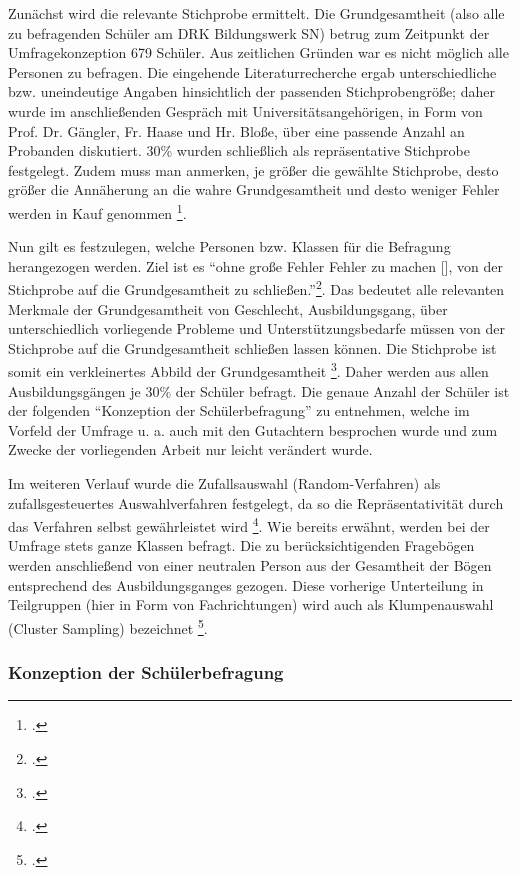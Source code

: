 \noindent
Zunächst wird die relevante Stichprobe ermittelt. Die Grundgesamtheit (also alle zu befragenden Schüler am DRK Bildungswerk SN) betrug zum Zeitpunkt der Umfragekonzeption 679 Schüler. Aus zeitlichen Gründen war es nicht möglich alle Personen zu befragen. Die eingehende Literaturrecherche ergab unterschiedliche bzw. uneindeutige Angaben hinsichtlich der passenden Stichprobengröße; daher wurde im anschließenden Gespräch mit Universitätsangehörigen, in Form von Prof. Dr. Gängler, Fr. Haase und Hr. Bloße, über eine passende Anzahl an Probanden diskutiert. 30\% wurden schließlich als repräsentative Stichprobe festgelegt. Zudem muss man anmerken, je größer die gewählte Stichprobe, desto größer die Annäherung an die wahre Grundgesamtheit und desto weniger Fehler werden in Kauf genommen \footcite[vgl.][65f]{Mayer2013}. 

Nun gilt es festzulegen, welche Personen bzw. Klassen für die Befragung herangezogen werden. Ziel ist es "`ohne große Fehler Fehler zu machen [\punkte], von der Stichprobe auf die Grundgesamtheit zu schließen."'\footcite[60]{Mayer2013}. Das bedeutet alle relevanten Merkmale der Grundgesamtheit von Geschlecht, Ausbildungsgang, über unterschiedlich vorliegende Probleme und Unterstützungsbedarfe müssen von der Stichprobe auf die Grundgesamtheit schließen lassen können. Die Stichprobe ist somit ein verkleinertes Abbild der Grundgesamtheit \footcite [vgl.][197]{Kromrey1995}. Daher werden aus allen Ausbildungsgängen je 30\% der Schüler befragt. Die genaue Anzahl der Schüler ist der folgenden "`Konzeption der Schülerbefragung"' zu entnehmen, welche im Vorfeld der Umfrage u. a. auch mit den Gutachtern besprochen wurde und zum Zwecke der vorliegenden Arbeit nur leicht verändert wurde.

Im weiteren Verlauf wurde die Zufallsauswahl (Random-Verfahren) als zufallsgesteuertes Auswahlverfahren festgelegt, da so die Repräsentativität durch das Verfahren selbst gewährleistet wird \footcite[vgl.][60]{Mayer2013}. Wie bereits erwähnt, werden bei der Umfrage stets ganze Klassen befragt. Die zu berücksichtigenden Fragebögen werden anschließend von einer neutralen Person aus der Gesamtheit der Bögen entsprechend des Ausbildungsganges gezogen. Diese vorherige Unterteilung in Teilgruppen (hier in Form von Fachrichtungen) wird auch als Klumpenauswahl (Cluster Sampling) bezeichnet \footcite[vgl.][63]{Mayer2013}.

\newpage
\subsubsection{Konzeption der Schülerbefragung}
\label{sec:KonzeptionDerSchülerbefragung}

